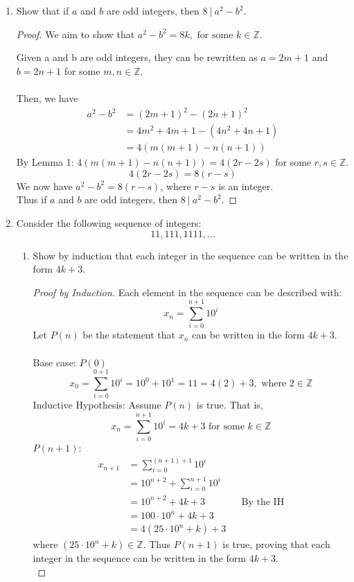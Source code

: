 \documentclass[letterpaper]{article}
\begin{document}
\begin{enumerate}
\begin{proof} [Proof by Induction]
	\end{proof}

	\item Show that if $a$ and $b$ are odd integers, then $8\ |\ a^2-b^2$.
	\begin{proof}
		We aim to show that $a^2-b^2 = 8k,\text{ for some }k\in\mathbb{Z}$.
		
		Given a and b are odd integers, they can be rewritten as 
		$a=2m+1$ and $b=2n+1$ for some $m,n\in\mathbb{Z}$.\\\\
		Then, we have
		\begin{equation*}
			\begin{split}
				a^2-b^2 
				& = (2m+1)^2-(2n+1)^2 \\
				& = 4m^2+4m+1-(4n^2+4n+1) \\
				& = 4(m(m+1)-n(n+1))
			\end{split}
		\end{equation*}
		By Lemma 1: $4(m(m+1)-n(n+1)) = 4(2r-2s)$ for some $r,s\in\mathbb{Z}$.
		\[
			4(2r-2s) = 8(r-s)
		\]
		We now have $a^2-b^2 = 8(r-s)$, where $r-s$ is an integer. \\
		Thus if $a$ and $b$ are odd integers, then $8\ |\ a^2-b^2$.
		
	\end{proof}
	
	\item Consider the following sequence of integers:
	\[
		11, 111, 1111, \dots
	\]
	\begin{enumerate}
		\item Show by induction that each integer in the sequence can be written in the form $4k + 3$.
			\begin{proof} [Proof by Induction]
				Each element in the sequence can be described with:
				\[
					x_n = \sum_{i=0}^{n+1}10^i
				\]
				Let $P(n)$ be the statement that $x_n$ can be written in the form $4k+3$.\\\\
				Base case: $P(0)$
				\[
					x_0 
					= \sum_{i=0}^{0+1}10^i
					= 10^0 + 10^1
					= 11
					= 4(2)+3, \text{ where }2\in\mathbb{Z}
				\]
				Inductive Hypothesis: Assume $P(n)$ is true. That is,
				\[
					x_n = \sum_{i=0}^{n+1}10^i = 4k+3 \text{ for some }k\in\mathbb{Z}
				\]
				$P(n+1)$:
				\begin{align*}
					x_{n+1} & =\sum_{i=0}^{(n+1)+1}10^i \\
					& = 10^{n+2}+ \sum_{i=0}^{n+1}10^i \\
					& = 10^{n+2}+4k+3 && \text{By the IH} \\
					& = 100 \cdot 10^n+4k+3 \\
					& = 4(25 \cdot 10^n+k)+3
				\end{align*}
				where $(25 \cdot 10^n+k) \in \mathbb{Z}$. 
				Thus $P(n+1)$ is true, proving that each integer in the sequence can be written in the form $4k+3$.\\
			\end{proof}


\end{enumerate}
\end{enumerate}
\end{document}
